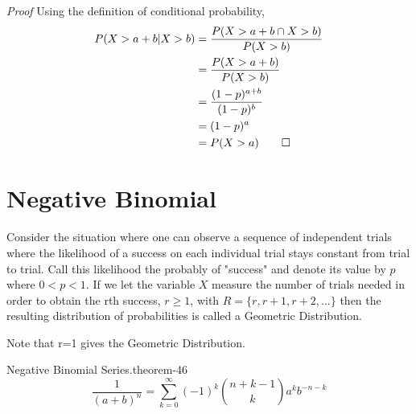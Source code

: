 \documentclass[10pt,]{book}
\makeatletter
\renewcommand*{\proofname}{Proof}
\renewenvironment{proof}[1][\proofname]{\par
  \pushQED{\qed}%
  \normalfont \topsep6\p@\@plus6\p@\relax
  \trivlist
  \item\relax
    {\itshape
    #1\@addpunct{.}}\hspace\labelsep\ignorespaces
}{%
  \popQED\endtrivlist\@endpefalse
}
\numberwithin{equation}{section}
\newcommand{\lt}{<}
\makeatother
\begin{document}
\begin{proof}\hypertarget{proof-48}{}
\hypertarget{p-963}{}%
Using the definition of conditional probability,%
\begin{align*}
P( X > a + b | X > b ) & = \frac{P( X > a + b \cap X > b )}{P( X > b)}\\
& = \frac{P( X > a + b )}{P( X > b)}\\
& = \frac{(1-p)^{a+b}}{(1-p)^b}\\
& = (1-p)^a\\
& = P(X > a)\qedhere
\end{align*}
%
\end{proof}
%
%
%
\typeout{************************************************}
\typeout{************************************************}
%
\section[{Negative Binomial}]{Negative Binomial}\label{section-48}
\hypertarget{p-964}{}%
Consider the situation where one can observe a sequence  of independent trials where the likelihood of a success on each individual trial stays constant from trial to trial. Call this likelihood the probably of "success" and denote its value by \(p\) where \(0 \lt p \lt 1 \). If we let the variable \(X\) measure the number of trials needed in order to obtain the rth success, \(r \ge 1\), with \(R = \{r, r+1, r+2, ... \}\) then the resulting distribution of probabilities is called a Geometric Distribution.%
\par
\hypertarget{p-965}{}%
Note that r=1 gives the Geometric Distribution.%
\par
\hypertarget{p-966}{}%
\begin{theorem}{Negative Binomial Series.}{}{theorem-46}%
\hypertarget{p-967}{}%
%
\begin{equation*}
\displaystyle \frac{1}{(a+b)^n} = \sum_{k=0}^{\infty} {(-1)^k \binom{n + k - 1}{k} a^k b^{-n-k}}
\end{equation*}
%
\end{theorem}
\end{document}
